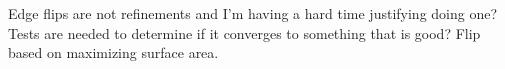 Edge flips are not refinements and I’m having a hard time justifying doing one? Tests are needed to determine if it converges to something that is good? Flip based on maximizing surface area.
